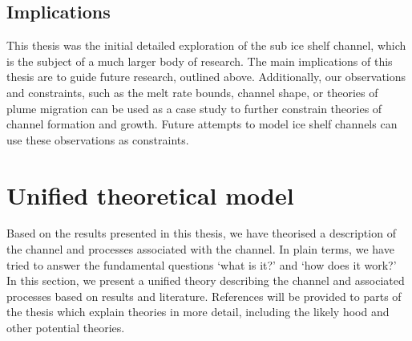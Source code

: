 \subsection{Implications}

This thesis was the initial detailed exploration of the sub ice shelf channel, which is the subject of a much larger body of research. The main implications of this thesis are to guide future research, outlined above. Additionally, our observations and constraints, such as the melt rate bounds, channel shape, or theories of plume migration can be used as a case study to further constrain theories of channel formation and growth. Future attempts to model ice shelf channels can use these observations as constraints. 


\section{Unified theoretical model} \label{sec:unified}

Based on the results presented in this thesis, we have theorised a description of the channel and processes associated with the channel.  In plain terms, we have tried to answer the fundamental questions `what is it?' and `how does it work?' In this section, we present a unified theory describing the channel and associated processes based on results and literature.  References will be provided to parts of the thesis which explain theories in more detail, including the likely hood and other potential theories.

